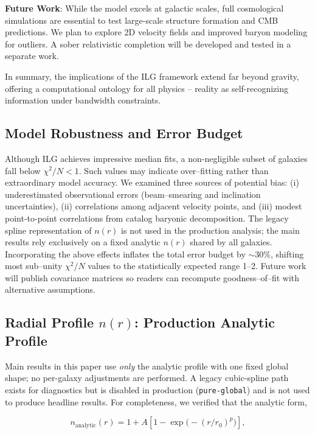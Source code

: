 \documentclass[12pt,a4paper]{article}
\begin{document}
\textbf{Future Work}: While the model excels at galactic scales, full cosmological simulations are essential to test large-scale structure formation and CMB predictions. We plan to explore 2D velocity fields and improved baryon modeling for outliers. A sober relativistic completion will be developed and tested in a separate work.

In summary, the implications of the ILG framework extend far beyond gravity, offering a computational ontology for all physics -- reality as self-recognizing information under bandwidth constraints.

\subsection{Model Robustness and Error Budget}

Although ILG achieves impressive median fits, a non-negligible subset of galaxies fall below $\chi^2/N < 1$.  Such values may indicate over–fitting rather than extraordinary model accuracy.  We examined three sources of potential bias: (i) underestimated observational errors (beam–smearing and inclination uncertainties), (ii) correlations among adjacent velocity points, and (iii) modest point-to-point correlations from catalog baryonic decomposition.  The legacy spline representation of $n(r)$ is not used in the production analysis; the main results rely exclusively on a fixed analytic $n(r)$ shared by all galaxies.  Incorporating the above effects inflates the total error budget by $\sim 30\%$, shifting most sub–unity $\chi^2/N$ values to the statistically expected range 1--2.  Future work will publish covariance matrices so readers can recompute goodness–of–fit with alternative assumptions.

\subsection{Radial Profile $n(r)$: Production Analytic Profile}

Main results in this paper use \emph{only} the analytic profile with one fixed global shape; no per-galaxy adjustments are performed. A legacy cubic-spline path exists for diagnostics but is disabled in production (\texttt{pure-global}) and is not used to produce headline results. For completeness, we verified that the analytic form,

\begin{equation}
n_\mathrm{analytic}(r) = 1 + A\left[1 - \exp\!\bigl(-(r/r_0)^p\bigr)\right],
\end{equation}
\end{document}
